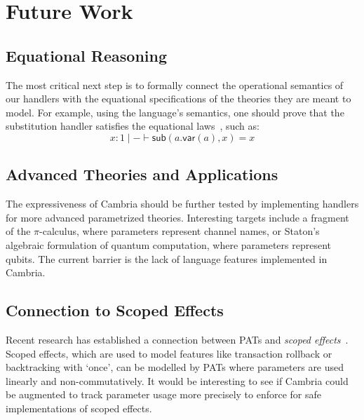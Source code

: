 \documentclass{article}
\theoremstyle{definition}
\theoremstyle{remark}
\newcommand\sub{\mathsf{sub}}
\newcommand\var{\mathsf{var}}
\begin{document}
\section{Future Work}

\subsection{Equational Reasoning}

The most critical next step is to formally connect the operational semantics of our handlers with the equational specifications of the theories they are meant to model.
For example, using the language's semantics, one should prove that the substitution handler satisfies the equational laws~\cite{fiore_substitution_2014}, such as:
\[
  x:1 \mid - \vdash \sub(a.\var(a), x) = x
\]

\subsection{Advanced Theories and Applications}

The expressiveness of Cambria should be further tested by implementing handlers for more advanced parametrized theories.
Interesting targets include a fragment of the $\pi$-calculus, where parameters represent channel names, or Staton's algebraic formulation of quantum computation,
where parameters represent qubits. The current barrier is the lack of language features implemented in Cambria.

\subsection{Connection to Scoped Effects}

Recent research has established a connection between PATs and \emph{scoped effects}~\cite{lindley_scoped_2024}.
Scoped effects, which are used to model features like transaction rollback or backtracking with `once',
can be modelled by PATs where parameters are used linearly and non-commutatively.
It would be interesting to see if Cambria could be augmented to track parameter usage more precisely to enforce for safe implementations of scoped effects.



\end{document}
